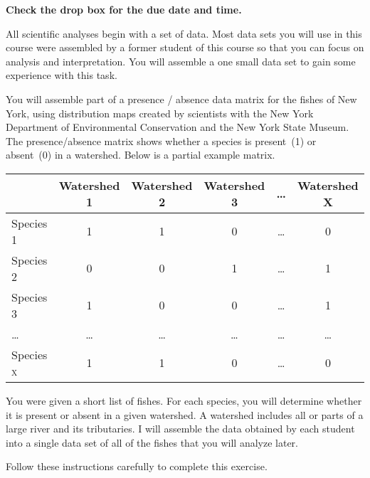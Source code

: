 \documentclass[12pt]{exam}
\begin{document}
\textbf{Check the drop box for the due date and time.}

All scientific analyses begin with a set of data. Most data sets 
you will use in this course were assembled by a former student
of this course so that you can focus on analysis and interpretation. You 
will assemble a one small data set to gain some 
experience with this task.

You will assemble part of a presence / absence data matrix for 
the fishes of New York, using distribution maps created by 
scientists with the New York Department of Environmental 
Conservation and the New York State Museum. The presence/absence matrix shows whether a species is 
present~(1) or absent~(0) in a watershed. 
Below is a partial example matrix.

\begin{longtable}[]{@{}lccccc@{}}
\toprule
& Watershed 1 & Watershed 2 & Watershed 3 & \ldots{} & Watershed
X\tabularnewline
\midrule
\endhead
Species 1 & 1 & 1 & 0 & \ldots{} & 0\tabularnewline
Species 2 & 0 & 0 & 1 & \ldots{} & 1\tabularnewline
Species 3 & 1 & 0 & 0 & \ldots{} & 1\tabularnewline
\ldots{} & \ldots{} & \ldots{} & \ldots{} & \ldots{} &
\ldots{}\tabularnewline
Species \textsc{x} & 1 & 1 & 0 & \ldots{} & 0\tabularnewline
\bottomrule
\end{longtable}

You were given a short list of fishes. For each species, you 
will determine whether it is present or absent in a given 
watershed. A watershed includes all or parts of a large river and 
its tributaries. I will assemble the data obtained by each 
student into a single data set of all of the fishes that 
you will analyze later.

Follow these instructions carefully to complete this
exercise.
\end{document}
